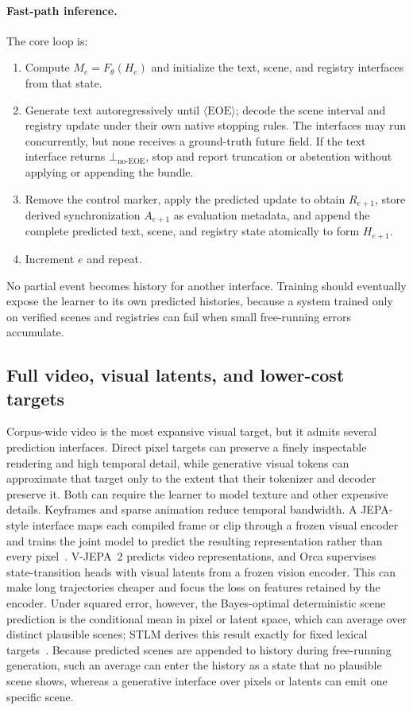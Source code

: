 \documentclass[11pt]{article}
\begin{document}
\paragraph{Fast-path inference.} The core loop is:
\begin{enumerate}[leftmargin=1.6em,itemsep=2pt,topsep=3pt]
  \item Compute $M_e=F_\theta(H_e)$ and initialize the text, scene, and registry interfaces from that state.
  \item Generate text autoregressively until $\langle\mathrm{EOE}\rangle$; decode the scene interval and registry update under their own native stopping rules. The interfaces may run concurrently, but none receives a ground-truth future field. If the text interface returns $\bot_{\mathrm{no\text{-}EOE}}$, stop and report truncation or abstention without applying or appending the bundle.
  \item Remove the control marker, apply the predicted update to obtain $R_{e+1}$, store derived synchronization $A_{e+1}$ as evaluation metadata, and append the complete predicted text, scene, and registry state atomically to form $H_{e+1}$.
  \item Increment $e$ and repeat.
\end{enumerate}
No partial event becomes history for another interface. Training should eventually expose the learner to its own predicted histories, because a system trained only on verified scenes and registries can fail when small free-running errors accumulate.

\subsection{Full video, visual latents, and lower-cost targets}

Corpus-wide video is the most expansive visual target, but it admits several prediction interfaces. Direct pixel targets can preserve a finely inspectable rendering and high temporal detail, while generative visual tokens can approximate that target only to the extent that their tokenizer and decoder preserve it. Both can require the learner to model texture and other expensive details. Keyframes and sparse animation reduce temporal bandwidth. A JEPA-style interface maps each compiled frame or clip through a frozen visual encoder and trains the joint model to predict the resulting representation rather than every pixel~\cite{lecun2022path,vjepa2,orca2026}. V-JEPA~2 predicts video representations, and Orca supervises state-transition heads with visual latents from a frozen vision encoder. This can make long trajectories cheaper and focus the loss on features retained by the encoder. Under squared error, however, the Bayes-optimal deterministic scene prediction is the conditional mean in pixel or latent space, which can average over distinct plausible scenes; STLM derives this result exactly for fixed lexical targets~\cite{westerberg2026stlm}. Because predicted scenes are appended to history during free-running generation, such an average can enter the history as a state that no plausible scene shows, whereas a generative interface over pixels or latents can emit one specific scene.
\end{document}
